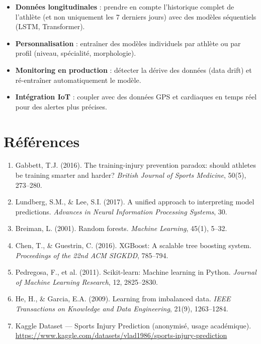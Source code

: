 \documentclass[12pt,a4paper]{report}
\begin{document}
\begin{itemize}
  \item \textbf{Données longitudinales} : prendre en compte l'historique complet de
        l'athlète (et non uniquement les 7 derniers jours) avec des modèles séquentiels
        (LSTM, Transformer).
  \item \textbf{Personnalisation} : entraîner des modèles individuels par athlète ou par
        profil (niveau, spécialité, morphologie).
  \item \textbf{Monitoring en production} : détecter la dérive des données (data drift)
        et ré-entraîner automatiquement le modèle.
  \item \textbf{Intégration IoT} : coupler avec des données GPS et cardiaques en temps
        réel pour des alertes plus précises.
\end{itemize}

\chapter*{Références}

\begin{enumerate}
  \item Gabbett, T.J. (2016). The training-injury prevention paradox: should athletes
        be training smarter and harder? \textit{British Journal of Sports Medicine}, 50(5), 273--280.

  \item Lundberg, S.M., \& Lee, S.I. (2017). A unified approach to interpreting model
        predictions. \textit{Advances in Neural Information Processing Systems}, 30.

  \item Breiman, L. (2001). Random forests. \textit{Machine Learning}, 45(1), 5--32.

  \item Chen, T., \& Guestrin, C. (2016). XGBoost: A scalable tree boosting system.
        \textit{Proceedings of the 22nd ACM SIGKDD}, 785--794.

  \item Pedregosa, F., et al. (2011). Scikit-learn: Machine learning in Python.
        \textit{Journal of Machine Learning Research}, 12, 2825--2830.

  \item He, H., \& Garcia, E.A. (2009). Learning from imbalanced data.
        \textit{IEEE Transactions on Knowledge and Data Engineering}, 21(9), 1263--1284.

  \item Kaggle Dataset — Sports Injury Prediction (anonymisé, usage académique).
        \url{https://www.kaggle.com/datasets/vlad1986/sports-injury-prediction}
\end{enumerate}
\end{document}
